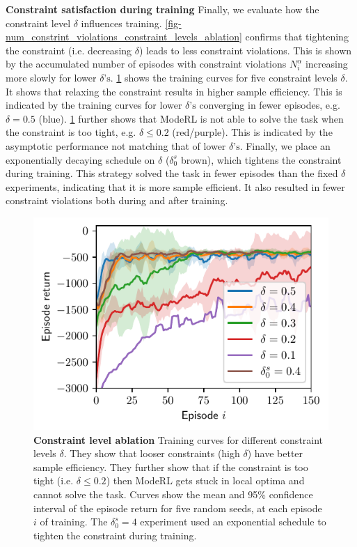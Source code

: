\documentclass[twoside]{article}
\newcommand{\modeVar}{\ensuremath{\alpha}}
\begin{document}
\textbf{Constraint satisfaction during training}
Finally, we evaluate how the constraint level \(\delta\) influences training.
\cref{fig-num_constrint_violations_constraint_levels_ablation} confirms that tightening the constraint (i.e. decreasing \(\delta\)) leads to less constraint violations.
This is shown by the accumulated number of episodes with constraint violations \(N^{\modeVar}_{i}\) increasing more slowly for lower \(\delta\text{'s}\).
\cref{fig-episode_return_constraint_levels_ablation} shows the training curves for five constraint levels \(\delta\).
It shows that relaxing the constraint results in higher sample efficiency.
This is indicated by the training curves for lower \(\delta\text{'s}\) converging in fewer episodes, e.g. \(\delta=0.5\) (blue).
\cref{fig-episode_return_constraint_levels_ablation} further shows that ModeRL is not able to solve the task when the constraint is too tight, e.g. \(\delta \leq 0.2\) (red/purple).
This is indicated by the asymptotic performance not matching that of lower \(\delta\text{'s}\).
Finally, we place an exponentially decaying schedule on \(\delta\) (\(\delta_{0}^{s}\) brown), which tightens the
constraint during training.
This strategy solved the task in fewer episodes than the fixed \(\delta\) experiments, indicating that it
is more sample efficient.
It also resulted in fewer constraint violations both during and after training.
\begin{figure}[t]
    \centering
    \includegraphics[width=0.95\columnwidth]{../experiments/figures/episode_return_constraint_levels_ablation.pdf}
    \caption{\textbf{Constraint level ablation} Training curves for different constraint levels $\delta$. They show that looser constraints (high $\delta$) have better sample efficiency. They further show that if the constraint is too tight (i.e. $\delta\leq0.2$) then ModeRL gets stuck in local optima and cannot solve the task. Curves show the mean and 95\% confidence interval of the episode return for five random seeds, at each episode $i$ of training. The $\delta^{s}_{0}=4$ experiment used an exponential schedule to tighten the constraint during training. }
    \label{fig-episode_return_constraint_levels_ablation}
\end{figure}
\end{document}
